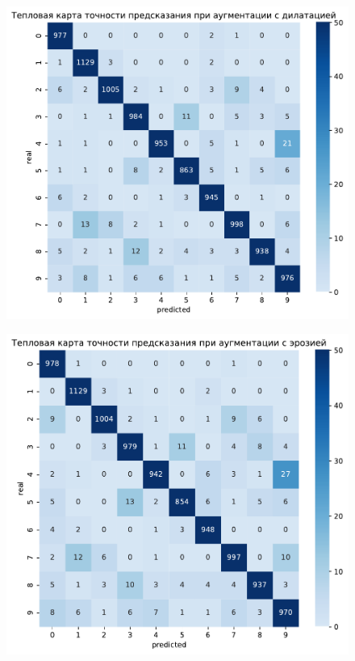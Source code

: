 \documentclass{article}
\begin{document}
\begin{figure}[H]
{\begin{minipage}{8cm}
			\includegraphics[scale=0.35]{TASK1 warm map dilate.pdf}
		\end{minipage}
		\label{app:dilate}
	}
	\subfigure
	{
		\begin{minipage}{8cm}
			\centering
			\includegraphics[scale=0.35]{TASK1 warm map erode.pdf}
		\end{minipage}
}
\end{figure}
\end{document}

